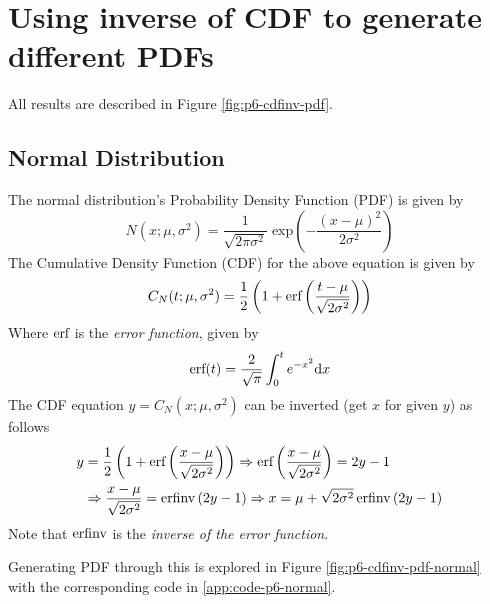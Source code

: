 \documentclass[main.tex]{article}
\begin{document}
    \section[P6: Distributions from CDF]{Using inverse of CDF to generate different PDFs}
    All results are described in Figure \ref{fig:p6-cdfinv-pdf}.
    \subsection{Normal Distribution}
    The normal distribution's Probability Density Function (PDF) is given by
    \begin{equation}
        N(x; \mu, \sigma^2) = \frac{1}{\sqrt{2\pi \sigma^2}} \; \mathrm{exp} \left ( -\frac{(x-\mu)^2}{2\sigma^2} \right )
        \label{eq:normal-3}
    \end{equation}
    The Cumulative Density Function (CDF) for the above equation is given by
    \begin{equation}
        C_{N} (t; \mu, \sigma^2) = \frac{1}{2} \left ( 1 + \textup{erf} \left ( \frac{t-\mu}{\sqrt{2 \sigma^2}} \right ) \right )
    \end{equation}
    Where $\textup{erf}$ is the \emph{error function}, given by
    \begin{equation}
        \textup{erf}(t) = \frac{2}{\sqrt{\pi}} \int_{0}^{t} e^{-x^2} \mathrm{d}x
    \end{equation}
    The CDF equation $y = C_{N} (x; \mu, \sigma^2)$ can be inverted (get $x$ for given $y$) as follows
    \begin{equation}
        \begin{split}
            y & = \frac{1}{2} \left ( 1 + \textup{erf} \left ( \frac{x-\mu}{\sqrt{2 \sigma^2}} \right ) \right )
            \Rightarrow \textup{erf} \left ( \frac{x-\mu}{\sqrt{2 \sigma^2}} \right ) = 2y-1 \\
            & \Rightarrow \frac{x-\mu}{\sqrt{2 \sigma^2}} = \textup{erfinv} \left ( 2y-1 \right )
            \Rightarrow x = \mu + \sqrt{2\sigma^2} \, \textup{erfinv} \left ( 2y-1 \right )
        \end{split}
    \end{equation}
    Note that $\textup{erfinv}$ is the \emph{inverse of the error function}.
    \par Generating PDF through this is explored in Figure \ref{fig:p6-cdfinv-pdf-normal} with the corresponding code in \ref{app:code-p6-normal}.
\end{document}

